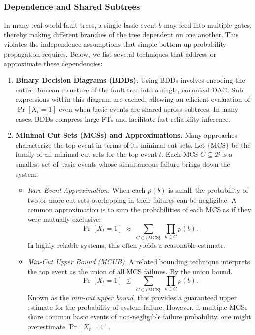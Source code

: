 \subsubsection{Dependence and Shared Subtrees}
In many real-world fault trees, a single basic event \(b\) may feed into multiple gates, thereby making different branches of the tree dependent on one another. This violates the independence assumptions that simple bottom-up probability propagation requires. Below, we list several techniques that address or approximate these dependencies:

\begin{enumerate}

  \item \textbf{Binary Decision Diagrams (BDDs).}  
  Using BDDs involves encoding the entire Boolean structure of the fault tree into a single, canonical DAG.  Sub-expressions within this diagram are cached, allowing an efficient evaluation of \(\Pr[X_t=1]\) even when basic events are shared across subtrees.  In many cases, BDDs compress large FTs and facilitate fast reliability inference.

  \item \textbf{Minimal Cut Sets (MCSs) and Approximations.}  
  Many approaches characterize the top event in terms of its minimal cut sets.  Let \(\{\mathrm{MCS}\}\) be the family of all minimal cut sets for the top event \(t\).  Each MCS \(C\subseteq \mathcal{B}\) is a smallest set of basic events whose simultaneous failure brings down the system.  

  \begin{itemize}
    \item \emph{Rare-Event Approximation.}  
    When each \(p(b)\) is small, the probability of two or more cut sets overlapping in their failures can be negligible.  A common approximation is to sum the probabilities of each MCS as if they were mutually exclusive:
    \begin{equation}\label{eq:rare_event_approx}
      \Pr[X_t=1]
      \;\approx\;
      \sum_{C\in \{\mathrm{MCS}\}}
      \;\prod_{b \in C} p(b).
    \end{equation}
    In highly reliable systems, this often yields a reasonable estimate.

    \item \emph{Min-Cut Upper Bound (MCUB).}  
    A related bounding technique interprets the top event as the union of all MCS failures. By the union bound,
    \begin{equation}\label{eq:mcub}
      \Pr[X_t=1]
      \;\le\;
      \sum_{C\in \{\mathrm{MCS}\}}
      \;\prod_{b \in C} p(b).
    \end{equation}
    Known as the \emph{min-cut upper bound}, this provides a guaranteed upper estimate for the probability of system failure.  However, if multiple MCSs share common basic events of non-negligible failure probability, one might overestimate \(\Pr[X_t=1]\).  
  \end{itemize}


\end{enumerate}
